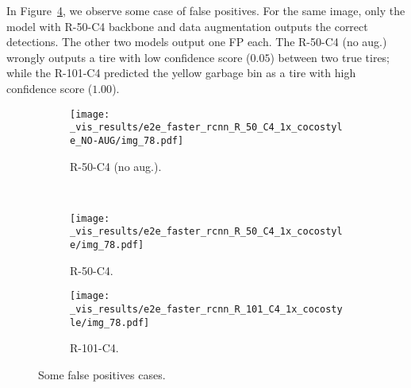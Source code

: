 %
%
In Figure~\ref{fig:FP_cases}, we observe some case of false positives.
For the same image, only the model with R-50-C4 backbone and data augmentation outputs the correct detections.
The other two models output one FP each. The R-50-C4 (no aug.) wrongly outputs a tire with low confidence score ($0.05$) between two true tires; while the R-101-C4 predicted the yellow garbage bin as a tire with high confidence score ($1.00$).
%
\begin{figure}[ht!]
  \centering
  \begin{subfigure}[t]{.85\linewidth}
    \centering
    \texttt{[image: \_vis\_results/e2e\_faster\_rcnn\_R\_50\_C4\_1x\_cocostyle\_NO-AUG/img\_78.pdf]}
    \caption{R-50-C4 (no aug.).}
    \label{fig:FP_cases_50N}
  \end{subfigure}\\
  \begin{subfigure}[t]{0.85\linewidth}
    \centering
    \texttt{[image: \_vis\_results/e2e\_faster\_rcnn\_R\_50\_C4\_1x\_cocostyle/img\_78.pdf]}
    \caption{R-50-C4.}
    \label{fig:FP_cases_50}
  \end{subfigure}
  \begin{subfigure}[t]{0.85\linewidth}
    \centering
    \texttt{[image: \_vis\_results/e2e\_faster\_rcnn\_R\_101\_C4\_1x\_cocostyle/img\_78.pdf]}
    \caption{R-101-C4.}
    \label{fig:FP_cases_101}
  \end{subfigure}
  \caption{Some false positives cases.}
  \label{fig:FP_cases}
\end{figure}
